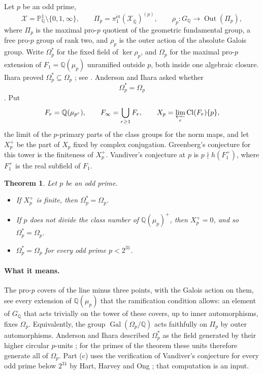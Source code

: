 \documentclass[11pt]{article}
\newtheorem{theorem}{Theorem}[section]
\theoremstyle{definition}
\numberwithin{equation}{section}
\begin{document}
Let $p$ be an odd prime,
\begin{equation}
 \mathcal X=\mathbb P^1_{\mathbb Q}\setminus\{0,1,\infty\},\qquad
 \Pi_p=\pi_1^{\mathrm{\acute et}}(\mathcal X_{\overline{\mathbb Q}})^{(p)},
 \qquad
 \rho_p:G_{\mathbb Q}\longrightarrow\operatorname{Out}(\Pi_p),
\end{equation}
where $\Pi_p$ is the maximal pro-$p$ quotient of the geometric fundamental group, a free pro-$p$ group of rank
two, and $\rho_p$ is the outer action of the absolute Galois group. Write $\Omega_p^*$ for the fixed field of
$\ker\rho_p$, and $\Omega_p$ for the maximal pro-$p$ extension of $F_1=\mathbb Q(\mu_p)$ unramified outside $p$,
both inside one algebraic closure. Ihara proved $\Omega_p^*\subseteq\Omega_p$ \cite{Ihara1986}; see
\cite[p.~1]{Sharifi2002}. Anderson and Ihara asked whether
\[
 \Omega_p^*=\Omega_p
\]
\cite[p.~272, question (a)]{AndersonIhara1988}. Put
\begin{equation}
 F_r=\mathbb Q(\mu_{p^r}),\qquad F_\infty=\bigcup_{r\ge1}F_r,
 \qquad X_p=\varprojlim_r\operatorname{Cl}(F_r)\{p\},
\end{equation}
the limit of the $p$-primary parts of the class groups for the norm maps, and let $X_p^+$ be the part of $X_p$
fixed by complex conjugation. Greenberg's conjecture for this tower is the finiteness of $X_p^+$. Vandiver's
conjecture at $p$ is $p\nmid h(F_1^+)$, where $F_1^+$ is the real subfield of $F_1$.

\begin{theorem}\label{thm:greenberg-kernel}
Let $p$ be an odd prime.
\begin{itemize}
\item[\textup{(a)}] If $X_p^+$ is finite, then $\Omega_p^*=\Omega_p$.
\item[\textup{(b)}] If $p$ does not divide the class number of $\mathbb Q(\mu_p)^+$, then $X_p^+=0$, and so
$\Omega_p^*=\Omega_p$.
\item[\textup{(c)}] $\Omega_p^*=\Omega_p$ for every odd prime $p<2^{31}$.
\end{itemize}
\end{theorem}

\paragraph{What it means.}
The pro-$p$ covers of the line minus three points, with the Galois action on them, see every extension of
$\mathbb Q(\mu_p)$ that the ramification condition allows: an element of $G_{\mathbb Q}$ that acts trivially on
the tower of these covers, up to inner automorphisms, fixes $\Omega_p$. Equivalently, the group
$\operatorname{Gal}(\Omega_p/\mathbb Q)$ acts faithfully on $\Pi_p$ by outer automorphisms. Anderson and Ihara
described $\Omega_p^*$ as the field generated by their higher circular $p$-units \cite{AndersonIhara1988}; for the
primes of the theorem these units therefore generate all of $\Omega_p$. Part (c) uses the verification of
Vandiver's conjecture for every odd prime below $2^{31}$ by Hart, Harvey and Ong
\cite[Section 1, item (2)]{HartHarveyOng2017}; that computation is an input.
\end{document}
